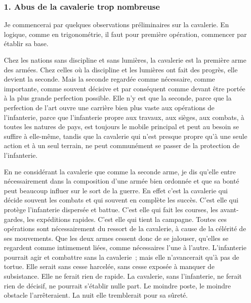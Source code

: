 \documentclass[french,twoside]{book} %
\begin{document}
\subsubsection[{1. Abus de la cavalerie trop nombreuse}]{1. Abus de la cavalerie trop nombreuse}
\noindent Je commencerai par quelques observations préliminaires sur la cavalerie. En logique, comme en trigonométrie, il faut pour première opération, commencer par établir sa base.\par
Chez les nations sans discipline et sans lumières, la cavalerie est la première arme des armées. Chez celles où la discipline et les lumières ont fait des progrès, elle devient la seconde. Mais la seconde regardée comme nécessaire, comme importante, comme souvent décisive et par conséquent comme devant être portée à la plus grande perfection possible. Elle n’y est que la seconde, parce que la perfection de l’art ouvre une carrière bien plus vaste aux opérations de l’infanterie, parce que l’infanterie propre aux travaux, aux sièges, aux combats, à toutes les natures de pays, est toujours le mobile principal et peut au besoin se suffire à elle-même, tandis que la cavalerie qui n’est presque propre qu’à une seule action et à un seul terrain, ne peut communément se passer de la protection de l’infanterie.\par
En ne considérant la cavalerie que comme la seconde arme, je dis qu’elle entre nécessairement dans la composition d’une armée bien ordonnée et que sa bonté peut beaucoup influer sur le sort de la guerre. En effet c’est la cavalerie qui décide souvent les combats et qui souvent en complète les succès. C’est elle qui protège l’infanterie dispersée et battue. C’est elle qui fait les courses, les avant-gardes, les expéditions rapides. C’est elle qui tient la campagne. Toutes ces opérations sont nécessairement du ressort de la cavalerie, à cause de la célérité de ses mouvements. Que les deux armes cessent donc de se jalouser, qu’elles se regardent comme intimement liées, comme nécessaires l’une à l’autre. L’infanterie pourrait agir et combattre sans la cavalerie ; mais elle n’avancerait qu’à pas de tortue. Elle serait sans cesse harcelée, sans cesse exposée à manquer de subsistance. Elle ne ferait rien de rapide. La cavalerie, sans l’infanterie, ne ferait rien de décisif, ne pourrait s’établir nulle part. Le moindre poste, le moindre obstacle l’arrêteraient. La nuit elle tremblerait pour sa sûreté.\par
\end{document}

